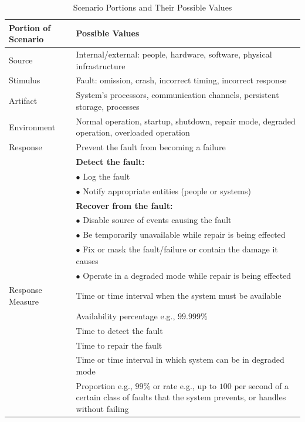 \begin{LTR}
    \begin{table}[H]
        \centering
        \begin{tabular}{|>{\raggedright\arraybackslash}p{}|>{\raggedright\arraybackslash}p{}|}
            \hline
            \textbf{Portion of Scenario} & \textbf{Possible Values} \\
            \hline
            Source & Internal/external: people, hardware, software, physical infrastructure \\
            \hline
            Stimulus & Fault: omission, crash, incorrect timing, incorrect response \\
            \hline
            Artifact & System’s processors, communication channels, persistent storage, processes \\
            \hline
            Environment & Normal operation, startup, shutdown, repair mode, degraded operation, overloaded operation \\
            \hline
            Response & Prevent the fault from becoming a failure \\
            & \textbf{Detect the fault:} \\
            & \quad $\bullet$ Log the fault \\
            & \quad $\bullet$ Notify appropriate entities (people or systems) \\
            & \textbf{Recover from the fault:} \\
            & \quad $\bullet$ Disable source of events causing the fault \\
            & \quad $\bullet$ Be temporarily unavailable while repair is being effected \\
            & \quad $\bullet$ Fix or mask the fault/failure or contain the damage it causes \\
            & \quad $\bullet$ Operate in a degraded mode while repair is being effected \\
            \hline
            Response Measure & Time or time interval when the system must be available \\
            & Availability percentage e.g., $99.999\%$ \\
            & Time to detect the fault \\
            & Time to repair the fault \\
            & Time or time interval in which system can be in degraded mode \\
            & Proportion e.g., $99\%$ or rate e.g., up to $100$ per second of a certain class of faults that the system prevents, or handles without failing \\
            \hline
        \end{tabular}
        \caption{Scenario Portions and Their Possible Values}
        \label{tab:scenario-possible-values}
    \end{table}
\end{LTR}